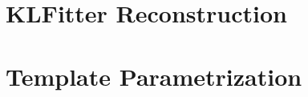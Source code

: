 \chapter{KLFitter Reconstruction}
\label{sec:app0}


%

\chapter{Template Parametrization}

\label{sec:apptem}






